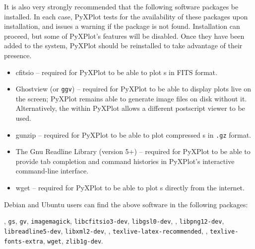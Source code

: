 \noindent It is also very strongly recommended that the following software
packages be installed. In each case, PyXPlot tests for the availability of
these packages upon installation, and issues a warning if the package is not
found. Installation can proceed, but some of PyXPlot's features will be
disabled. Once they have been added to the system, PyXPlot should be
reinstalled to take advantage of their presence.

\vspace{0.5cm}
\begin{itemize}
\item cfitsio -- required for PyXPlot to be able to plot \datafile s in FITS format.
\item Ghostview  (or {\tt ggv}) -- required for PyXPlot to be able to display plots live on the screen; PyXPlot remains able to generate image files on disk without it. Alternatively, the  within PyXPlot allows a different postscript viewer to be used.
\item gunzip  -- required for PyXPlot to be able to plot compressed \datafile s in {\tt .gz} format.
\item The Gnu Readline Library (version 5+)  -- required for PyXPlot to be able to provide tab completion and command histories in PyXPlot's interactive command-line interface.
\item wget  -- required for PyXPlot to be able to plot \datafile s directly from the internet.
\end{itemize}
\vspace{0.5cm}

Debian and Ubuntu users can find the above software in the following packages:

\vspace{2mm}
, {\tt gs}, {\tt gv}, {\tt imagemagick}, {\tt libcfitsio3-dev}, {\tt libgsl0-dev},\newline
{}, {\tt libpng12-dev}, {\tt libreadline5-dev}, {\tt libxml2-dev},\newline
{}, {\tt texlive-latex-recommended},\newline
{}, {\tt texlive-fonts-extra}, {\tt wget}, {\tt zlib1g-dev}.
\vspace{2mm}

